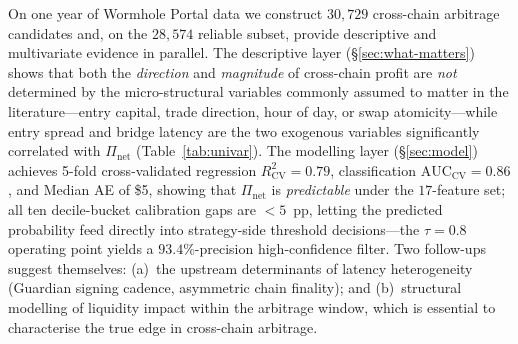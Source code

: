 \documentclass[sigconf,nonacm,10pt]{acmart}
\newcommand{\Pnet}{\Pi_{\text{net}}}
\begin{document}
On one year of Wormhole Portal data we construct $30{,}729$
cross-chain arbitrage candidates and, on the $28{,}574$ reliable
subset, provide descriptive and multivariate evidence in parallel.
The descriptive layer (\S\ref{sec:what-matters}) shows that both the
\emph{direction} and \emph{magnitude} of cross-chain profit are
\emph{not} determined by the micro-structural variables commonly
assumed to matter in the literature---entry capital, trade
direction, hour of day, or swap atomicity---while entry spread and
bridge latency are the two exogenous variables significantly
correlated with $\Pnet$ (Table~\ref{tab:univar}). The modelling
layer (\S\ref{sec:model}) achieves 5-fold cross-validated regression
$R^2_{\text{CV}}=0.79$, classification $\mathrm{AUC}_{\text{CV}}=0.86$,
and Median AE of \$5, showing that $\Pnet$ is \emph{predictable}
under the $17$-feature set; all ten decile-bucket calibration gaps
are $<\!5$~pp, letting the predicted probability feed directly into
strategy-side threshold decisions---the $\tau=0.8$ operating point
yields a $93.4\%$-precision high-confidence filter. Two follow-ups
suggest themselves: (a)~the upstream determinants of latency
heterogeneity (Guardian signing cadence, asymmetric chain finality);
and (b)~structural modelling of liquidity impact within the arbitrage
window, which is essential to characterise the true edge in
cross-chain arbitrage.
\end{document}
